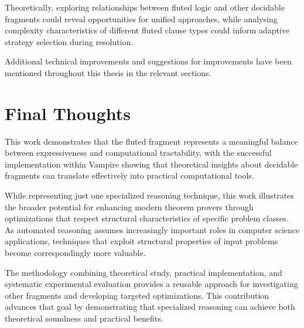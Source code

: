 Theoretically, exploring relationships between fluted logic and other decidable fragments could reveal opportunities for unified approaches, while analysing complexity characteristics of different fluted clause types could inform adaptive strategy selection during resolution.

Additional technical improvements and suggestions for improvements have been mentioned throughout this thesis in the relevant sections.

\section*{Final Thoughts}

This work demonstrates that the fluted fragment represents a meaningful balance between expressiveness and computational tractability, with the successful implementation within Vampire showing that theoretical insights about decidable fragments can translate effectively into practical computational tools.

While representing just one specialized reasoning technique, this work illustrates the broader potential for enhancing modern theorem provers through optimizations that respect structural characteristics of specific problem classes. As automated reasoning assumes increasingly important roles in computer science applications, techniques that exploit structural properties of input problems become correspondingly more valuable.

The methodology combining theoretical study, practical implementation, and systematic experimental evaluation provides a reusable approach for investigating other fragments and developing targeted optimizations. This contribution advances that goal by demonstrating that specialized reasoning can achieve both theoretical soundness and practical benefits.